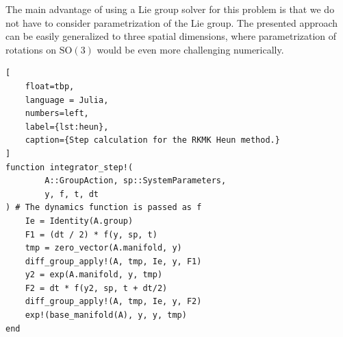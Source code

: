 \documentclass{juliacon}
\begin{document}
The main advantage of using a Lie group solver for this problem is that we do not have to consider parametrization of the Lie group.
The presented approach can be easily generalized to three spatial dimensions, where parametrization of rotations on $\mathrm{SO}(3)$ would be even more challenging numerically.

\begin{lstlisting}[
    float=tbp,
    language = Julia,
    numbers=left,
    label={lst:heun},
    caption={Step calculation for the RKMK Heun method.}
]
function integrator_step!(
        A::GroupAction, sp::SystemParameters,
        y, f, t, dt
) # The dynamics function is passed as f
    Ie = Identity(A.group)
    F1 = (dt / 2) * f(y, sp, t)
    tmp = zero_vector(A.manifold, y)
    diff_group_apply!(A, tmp, Ie, y, F1)
    y2 = exp(A.manifold, y, tmp)
    F2 = dt * f(y2, sp, t + dt/2)
    diff_group_apply!(A, tmp, Ie, y, F2)
    exp!(base_manifold(A), y, y, tmp)
end
\end{lstlisting}
\end{document}
